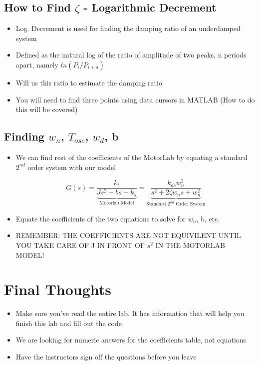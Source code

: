 \documentclass[11pt, oneside]{article}   	%
\begin{document}
\subsection{How to Find \(\zeta\) - Logarithmic Decrement}
\begin{itemize}
\item Log. Decrement is used for finding the damping ratio of an underdamped system
\item Defined as the natural log of the ratio of amplitude of two peaks, n periods apart, namely \(ln(P_i/P_{i+n})\)
\item Will us this ratio to estimate the damping ratio
\item You will need to find three points using data cursors in MATLAB (How to do this will be covered)
\end{itemize}

\subsection{Finding \(w_n\), \(T_{osc}\), \(w_d\), b}
\begin{itemize}
\item We can find rest of the coefficients of the MotorLab by equating a standard \(2^{nd}\) order system with our model

\[ G(s) = 
\underbrace{\frac{k_t}{Js^2 + bs + k_s}}_\text{Motorlab Model} = 
\underbrace{\frac{k_{dc}w_n^2 }{s^2 + 2\zeta w_n s + w_n^2}}_\text{Standard \(2^{nd}\) Order System}  \]

\item Equate the coefficients of the two equations to solve for \(w_n\), b, etc.
\item REMEMBER: THE COEFFICIENTS ARE NOT EQUIVILENT UNTIL YOU TAKE CARE OF J IN FRONT OF \(s^2\) IN THE MOTORLAB MODEL! 

\end{itemize}

\section{Final Thoughts}
\begin{itemize}
\item Make sure you've read the entire lab. It has information that will help you finish this lab and fill out the code
\item We are looking for numeric answers for the coefficients table, not equations
\item Have the instructors sign off the questions before you leave
\end{itemize}
\end{document}
